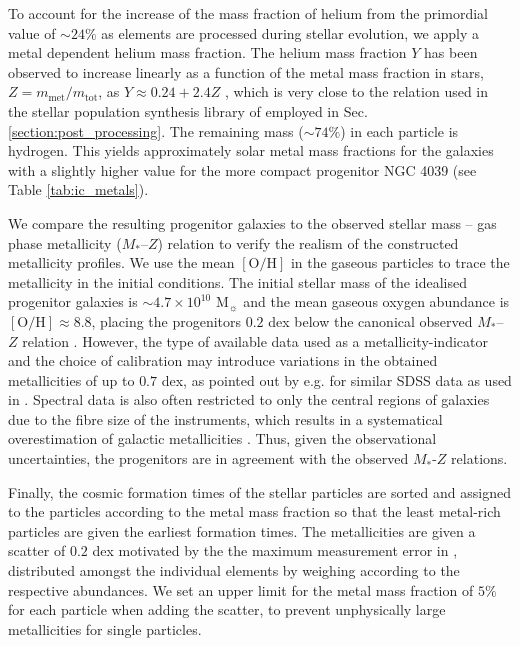 \documentclass[a4paper,fleqn,usenatbib]{mnras}
\begin{document}
To account for the increase of the mass fraction of helium from the
primordial value of $\sim 24\%$ as elements are 
processed during stellar evolution, we apply a metal dependent helium mass fraction.
The helium mass fraction $Y$ has been observed to increase linearly as a
function of the metal mass fraction in stars, $Z=m_\mathrm{met}/m_\mathrm{tot}$,
as $Y \approx 0.24 + 2.4Z$ \citep{2000MNRAS.313...99R, 2007MNRAS.382.1516C}, which is
very close to the relation used in the stellar population synthesis library of
\citet{2003MNRAS.344.1000B} employed in Sec. \ref{section:post_processing}. 
The remaining mass ($\sim 74\%$) in each particle is hydrogen. This yields approximately solar metal mass 
fractions for the galaxies with a slightly higher value for the more compact 
progenitor NGC 4039 (see Table \ref{tab:ic_metals}).


We compare the resulting progenitor galaxies to the observed stellar mass -- gas phase
metallicity ($M_*$--$Z$) relation to verify the realism of the constructed metallicity profiles. 
We use the mean $[\mathrm{O}/\mathrm{H}]$ in the gaseous particles to trace the
metallicity in the initial conditions.
The initial stellar mass of the idealised progenitor galaxies is
$\sim4.7\times 10^{10}$ M$_{\sun}$ and the mean gaseous oxygen abundance is
$\left[\mathrm{O/H}\right]\approx8.8$, placing the progenitors $0.2$ dex below the canonical
observed $M_*$--$Z$ relation
\citep{2004ApJ...613..898T}. However, the type of available data used as a metallicity-indicator 
and the choice of calibration may introduce variations
in the obtained metallicities of up to $0.7$ dex, as pointed out by e.g. \citet{2008ApJ...681.1183K} for
similar SDSS data as used in \citet{2004ApJ...613..898T}. Spectral data is also often
restricted to only the central regions of galaxies due to
 the fibre size of the instruments, which results in a systematical 
overestimation of galactic metallicities \citep{2015MNRAS.454.2381G}.
Thus, given the observational uncertainties, the progenitors are in agreement with the observed $M_*$-$Z$ relations.

Finally, the cosmic formation times of the stellar particles are sorted and 
assigned to the particles according to the metal mass fraction so that the 
least metal-rich particles are given the earliest formation times. The metallicities are given a scatter of $0.2$ dex motivated by the 
the maximum measurement error in \citet{1994A&A...291..757K}, distributed amongst the individual
elements by weighing according to the respective abundances. We set an upper limit for the metal mass fraction of 
$5\%$ for each particle when adding the scatter, to prevent unphysically large 
metallicities for single particles.
\end{document}
